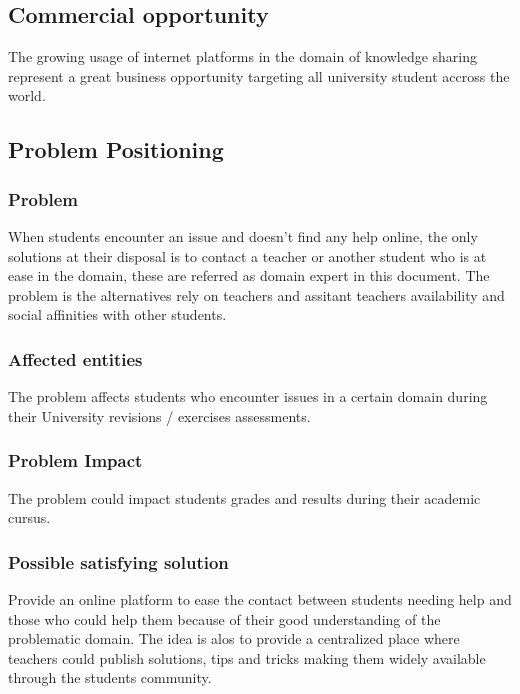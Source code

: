 \documentclass[12pt,a4paper,oneside, titlepage]{article}
\begin{document}
		\subsection{Commercial opportunity}
		    The growing usage of internet platforms in the domain of knowledge sharing
		    represent a great business opportunity targeting all university student accross 
		    the world.
		    
		    
		\subsection{Problem Positioning}
		
         \subsubsection{Problem}
         When students encounter an issue and doesn't find any help online, the only solutions at their disposal
         is to contact a teacher or another student who is at ease in the domain, these are referred as domain 
         expert in this document. The problem is the alternatives rely on teachers and assitant teachers 
         availability and social affinities with other students.
         
         \subsubsection{Affected entities}
         The problem affects students who encounter issues in a certain domain during their University 
         revisions / exercises assessments.
            
         \subsubsection{Problem Impact}
         The problem could impact students grades and results during their academic cursus. 
                  
         \subsubsection{Possible satisfying solution}
         Provide an online platform to ease the contact between students needing help and those who could help 
         them because of their good understanding of the problematic domain. The idea is alos to provide a 
         centralized place where teachers could publish solutions, tips and tricks making them widely available 
         through the students community.
         
\end{document}
